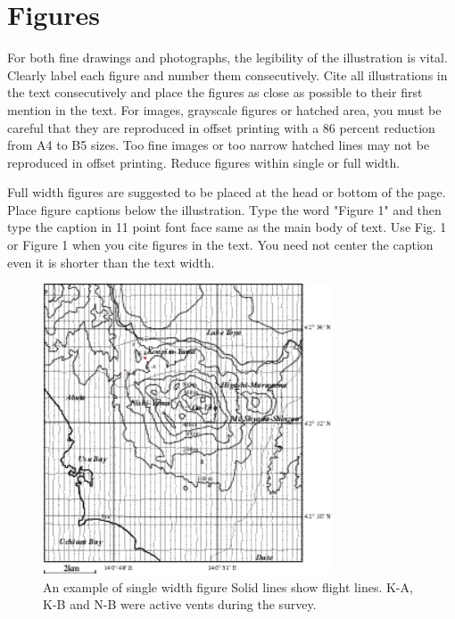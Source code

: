 \documentclass[times,twoside,5p]{ajam}
\begin{document}
\section{Figures}
\label{S:1}
For both fine drawings and photographs, the legibility of the illustration is vital. Clearly label each figure and number them consecutively. Cite all illustrations in the text consecutively and place the figures as close as possible to their first mention in the text. For images, grayscale figures or hatched area, you must be careful that they are reproduced in offset printing with a 86 percent reduction from A4 to B5 sizes. Too fine images or too narrow hatched lines may not be reproduced in offset printing. Reduce figures within single or full width.

Full width figures are suggested to be placed at the head or bottom of the page. Place figure captions below the illustration. Type the word "Figure 1" and then type the caption in 11 point font face same as the main body of text. Use Fig. 1 or Figure 1 when you cite figures in the text. You need not center the caption even it is shorter than the text width.

\begin{figure}[ht]\centering
\includegraphics[width=\linewidth]{Figure10}
\caption{An example of single width figure
Solid lines show flight lines. K-A, K-B and N-B were active vents during the survey.}
\label{fig:view}
\end{figure}
\end{document}
